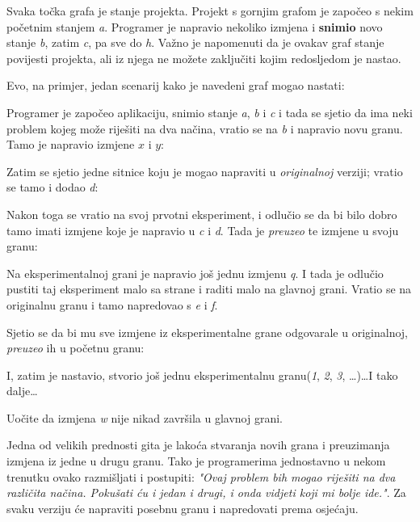 

Svaka točka grafa je stanje projekta. 
Projekt s gornjim grafom je započeo s nekim početnim stanjem \emph a.
Programer je napravio nekoliko izmjena i \textbf{snimio} novo stanje \emph b, zatim \emph c, pa sve do \emph h.
Važno je napomenuti da je ovakav graf stanje povijesti projekta, ali iz njega ne možete zaključiti kojim redosljedom je nastao.

Evo, na primjer, jedan scenarij kako je navedeni graf mogao nastati:



Programer je započeo aplikaciju, snimio stanje \emph a, \emph b i \emph c i tada se sjetio da ima neki problem kojeg može riješiti na dva načina, vratio se na \emph b i napravio novu granu. Tamo je napravio izmjene $x$ i $y$:



Zatim se sjetio jedne sitnice koju je mogao napraviti u \emph{originalnoj} verziji; vratio se tamo i dodao \emph d:



Nakon toga se vratio na svoj prvotni eksperiment, i odlučio se da bi bilo dobro tamo imati izmjene koje je napravio u \emph c i \emph d.
Tada je \emph{preuzeo} te izmjene u svoju granu:



Na eksperimentalnoj grani je napravio još jednu izmjenu \emph q.
I tada je odlučio pustiti taj eksperiment malo sa strane i raditi malo na glavnoj grani.
Vratio se na originalnu granu i tamo napredovao s \emph e i \emph f. 



Sjetio se da bi mu sve izmjene iz eksperimentalne grane odgovarale u originalnoj, \emph{preuzeo} ih u početnu granu:



I, zatim je nastavio, stvorio još jednu eksperimentalnu granu(\emph 1, \emph 2, \emph 3, \dots)\dots I tako dalje\dots



Uočite da izmjena \emph w nije nikad završila u glavnoj grani. 

Jedna od velikih prednosti gita je lakoća stvaranja novih grana i preuzimanja izmjena iz jedne u drugu granu. 
Tako je programerima jednostavno u nekom trenutku ovako razmišljati i postupiti: \emph{"Ovaj problem bih mogao riješiti na dva različita načina. Pokušati ću i jedan i drugi, i onda vidjeti koji mi bolje ide."}. Za svaku verziju će napraviti posebnu granu i napredovati prema osjećaju.

